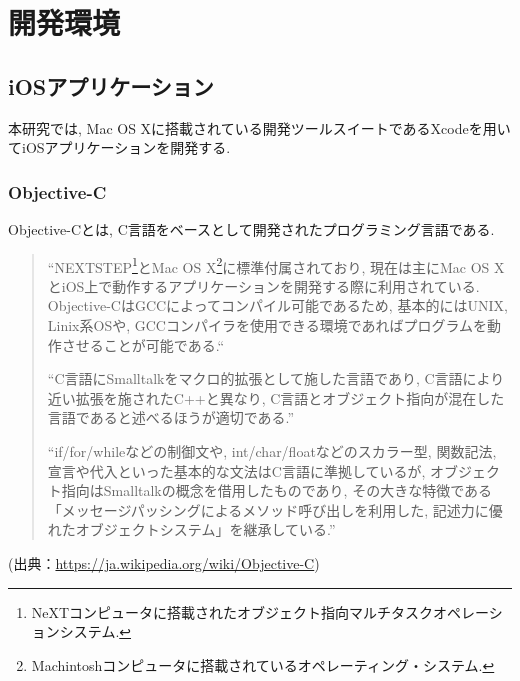 \chapter{開発環境}
\label{chap:concept}

\section{iOSアプリケーション}
本研究では, Mac OS Xに搭載されている開発ツールスイートであるXcodeを用いてiOSアプリケーションを開発する.

\subsection{Objective-C}
Objective-Cとは, C言語をベースとして開発されたプログラミング言語である.

\begin{quotation}
“NEXTSTEP\footnote{NeXTコンピュータに搭載されたオブジェクト指向マルチタスクオペレーションシステム.}とMac OS X\footnote{Machintoshコンピュータに搭載されているオペレーティング・システム.}に標準付属されており, 現在は主にMac OS XとiOS上で動作するアプリケーションを開発する際に利用されている.
Objective-CはGCCによってコンパイル可能であるため, 基本的にはUNIX, Linix系OSや, GCCコンパイラを使用できる環境であればプログラムを動作させることが可能である.“

“C言語にSmalltalkをマクロ的拡張として施した言語であり, C言語により近い拡張を施されたC++と異なり, C言語とオブジェクト指向が混在した言語であると述べるほうが適切である.”

“if/for/whileなどの制御文や, int/char/floatなどのスカラー型, 関数記法, 宣言や代入といった基本的な文法はC言語に準拠しているが, オブジェクト指向はSmalltalkの概念を借用したものであり, その大きな特徴である「メッセージパッシングによるメソッド呼び出しを利用した, 記述力に優れたオブジェクトシステム」を継承している.”
\end{quotation}
\begin{flushright}
(出典：\url{https://ja.wikipedia.org/wiki/Objective-C})
\end{flushright}

